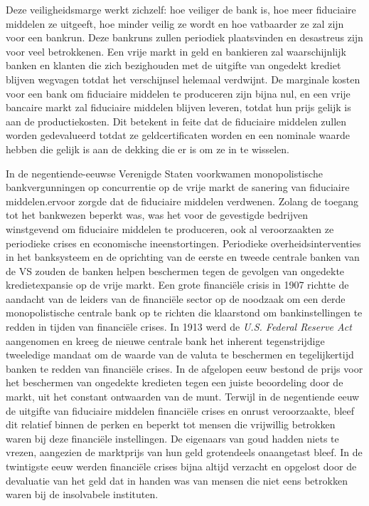 Deze veiligheidsmarge werkt zichzelf: hoe veiliger de bank is, hoe meer fiduciaire middelen ze uitgeeft, hoe minder veilig ze wordt en hoe vatbaarder ze zal zijn voor een bankrun. Deze bankruns zullen periodiek plaatsvinden en desastreus zijn voor veel betrokkenen. Een vrije markt in geld en bankieren zal waarschijnlijk banken en klanten die zich bezighouden met de uitgifte van ongedekt krediet blijven wegvagen totdat het verschijnsel helemaal verdwijnt. De marginale kosten voor een bank om fiduciaire middelen te produceren zijn bijna nul, en een vrije bancaire markt zal fiduciaire middelen blijven leveren, totdat hun prijs gelijk is aan de productiekosten. Dit betekent in feite dat de fiduciaire middelen zullen worden gedevalueerd totdat ze geldcertificaten worden en een nominale waarde hebben die gelijk is aan de dekking die er is om ze in te wisselen.

In de negentiende-eeuwse Verenigde Staten voorkwamen monopolistische bankvergunningen op concurrentie op de vrije markt de sanering van fiduciaire middelen.ervoor zorgde dat de fiduciaire middelen verdwenen. Zolang de toegang tot het bankwezen beperkt was, was het voor de gevestigde bedrijven winstgevend om fiduciaire middelen te produceren, ook al veroorzaakten ze periodieke crises en economische ineenstortingen. Periodieke overheidsinterventies in het banksysteem en de oprichting van de eerste en tweede centrale banken van de VS zouden de banken helpen beschermen tegen de gevolgen van ongedekte kredietexpansie op de vrije markt. Een grote financiële crisis in 1907 richtte de aandacht van de leiders van de financiële sector op de noodzaak om een derde monopolistische centrale bank op te richten die klaarstond om bankinstellingen te redden in tijden van financiële crises. In 1913 werd de \textit{U.S. Federal Reserve Act} aangenomen en kreeg de nieuwe centrale bank het inherent tegenstrijdige tweeledige mandaat om de waarde van de valuta te beschermen en tegelijkertijd banken te redden van financiële crises. In de afgelopen eeuw bestond de prijs voor het beschermen van ongedekte kredieten tegen een juiste beoordeling door de markt, uit het constant ontwaarden van de munt. Terwijl in de negentiende eeuw de uitgifte van fiduciaire middelen financiële crises en onrust veroorzaakte, bleef dit relatief binnen de perken en beperkt tot mensen die vrijwillig betrokken waren bij deze financiële instellingen. De eigenaars van goud hadden niets te vrezen, aangezien de marktprijs van hun geld grotendeels onaangetast bleef. In de twintigste eeuw werden financiële crises bijna altijd verzacht en opgelost door de devaluatie van het geld dat in handen was van mensen die niet eens betrokken waren bij de insolvabele instituten.

